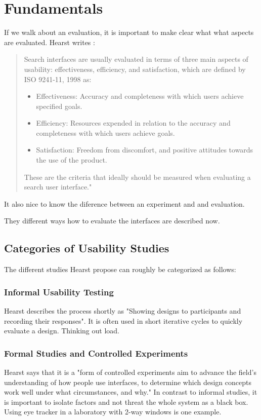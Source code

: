 \documentclass[11pt]{report}
\begin{document}
\section{Fundamentals}

  If we walk about an evaluation, it is important to make clear what what aspects are evaluated. Hearst writes \cite{Hearst2009}:
  \begin{quote}
  Search interfaces are usually evaluated in terms of three main aspects of usability: effectiveness, efficiency, and satisfaction, which are defined by ISO 9241-11, 1998 \cite{ISO} as:
\begin{itemize}
	\item Effectiveness: Accuracy and completeness with which users achieve specified goals.
	\item Efficiency: Resources expended in relation to the accuracy and completeness with which users achieve goals.
	\item Satisfaction: Freedom from discomfort, and positive attitudes towards the use of the product.
\end{itemize}
These are the criteria that ideally should be measured when evaluating a search user interface."
\end{quote}

It also nice to know the diference between an experiment and and evaluation.

They different ways how to evaluate the interfaces are described now.

\subsection{Categories of Usability Studies}
The different studies Hearst \cite{Hearst2009} propose can roughly be categorized as follows:

\subsubsection{Informal Usability Testing}
Hearst \cite{Hearst2009} describes the process shortly as "Showing designs to participants and recording their responses". It is often used in short iterative cycles to quickly evaluate a design. Thinking out load.

\subsubsection{Formal Studies and Controlled Experiments}
Hearst \cite{Hearst2009} says that it is a "form of controlled experiments aim to advance the field's understanding of how people use interfaces, to determine which design concepts work well under what circumstances, and why."  In contrast to informal studies, it is important to isolate factors and not threat the whole system as a black box. Using eye tracker in a laboratory with 2-way windows is one example.
	
\end{document}
